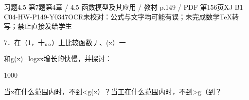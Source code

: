 \begin{bankitem}{习题4.5 第7题}{第4章 / 4.5 函数模型及其应用 / 教材 p.149 / PDF 第156页}{XJ-B1-C04-HW-P149-Y0347}{OCR未校对：公式与文字均可能有误；未完成数学TeX转写；禁止直接发给学生}
\begin{ocrdraft}
\par
7．在（1，十。。）上比较函数丿、(x）一
\par
和g(x)=logzx增长的快慢，并探讨：
\par
1000
\par
当x在什么范围内时，不到<g(x）？当工在什么范围内时，不到>g（到？
\end{ocrdraft}
\end{bankitem}
